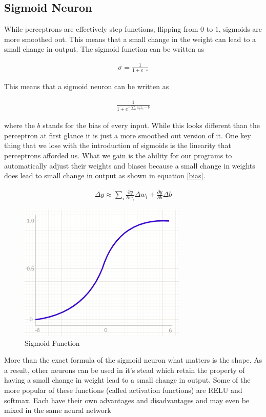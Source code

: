 \subsection{Sigmoid Neuron}

While perceptrons are effectively step functions, flipping from $0$ to $1$, sigmoids are more smoothed out.
This means that a small change in the weight can lead to a small change in output.
The sigmoid function can be written as

\begin{align}
  \sigma = \frac{1}{1 + e^{-z}}
\end{align}

This means that a sigmoid neuron can be written as

\begin{align}
  \frac{1}{1 + e^{-\sum_i w_i x_i - b}}
\end{align}

where the $b$ stands for the bias of every input.
While this looks different than the perceptron at first glance it is just a more smoothed out version of it.
One key thing that we lose with the introduction of sigmoids is the linearity that perceptrons afforded us.
What we gain is the ability for our programs to automatically adjust their weights and biases because a small change in weights does lead to small change in output as shown in equation \ref{bias}.

\begin{align}\label{bias}
  \Delta y \approx \sum_i \frac{\partial y}{\partial w_i}\Delta w_i + \frac{\partial y}{\partial b}\Delta b
\end{align}

\begin{figure}[H]
  \centering
  \includegraphics[width=80mm]{figures/sigmoid.png}
  \caption{Sigmoid Function}
  \label{network}
\end{figure}

More than the exact formula of the sigmoid neuron what matters is the shape.
As a result, other neurons can be used in it's stead which retain the property of having a small change in weight lead to a small change in output.
Some of the more popular of these functions (called activation functions) are RELU and softmax.
Each have their own advantages and disadvantages and may even be mixed in the same neural network

